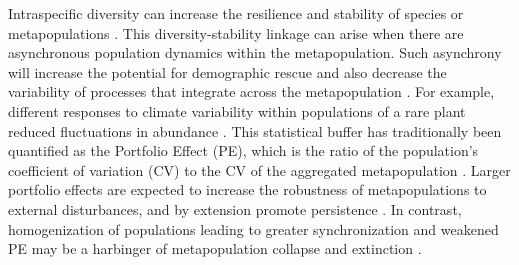 \documentclass{revtex4}
\begin{document}
Intraspecific diversity can increase the resilience and stability of species or metapopulations \citep{Gibert:2016cu}. 
This diversity-stability linkage can arise when there are asynchronous population dynamics within the metapopulation. 
Such asynchrony will increase the potential for demographic rescue \citep{Brown:1977gk,Earn:2000fm} and also decrease the variability of processes that integrate across the metapopulation \citep{Anonymous:2015gf}. 
For example, different responses to climate variability within populations of a rare plant reduced fluctuations in abundance \citep{Abbott:2017hl}. 
This statistical buffer has traditionally been quantified as the Portfolio Effect (PE), which is the ratio of the population's coefficient of variation (CV) to the CV of the aggregated metapopulation \citep{Thibaut:2012km}. 
Larger portfolio effects are expected to increase the robustness of metapopulations to external disturbances, and by extension promote persistence \citep{Thibaut:2012km}.
In contrast, homogenization of populations leading to greater synchronization and weakened PE may be a harbinger of metapopulation collapse and extinction \citep{Carlson:2011ce}.
\end{document}
